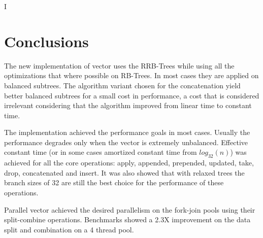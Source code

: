 I%

\chapter{Conclusions} %

\label{Conclusions} %




The new implementation of vector uses the RRB-Trees while using all the optimizations that where possible on RB-Trees. In most cases they are applied on balanced subtrees. The algorithm variant chosen for the concatenation yield better balanced subtrees for a small cost in performance, a cost that is considered irrelevant considering that the algorithm improved from linear time to constant time.

The implementation achieved the performance goals in most cases. Usually the performance degrades only when the vector is extremely unbalanced. Effective constant time (or in some cases amortized constant time from $log_{32}(n)$) was achieved for all the core operations: apply, appended, prepended, updated, take, drop, concatenated and insert. It was also showed that with relaxed trees the branch sizes of 32 are still the best choice for the performance of these operations.

Parallel vector achieved the desired parallelism on the fork-join pools using their split-combine operations. Benchmarks showed a 2.3X improvement on the data split and combination on a 4 thread pool.

